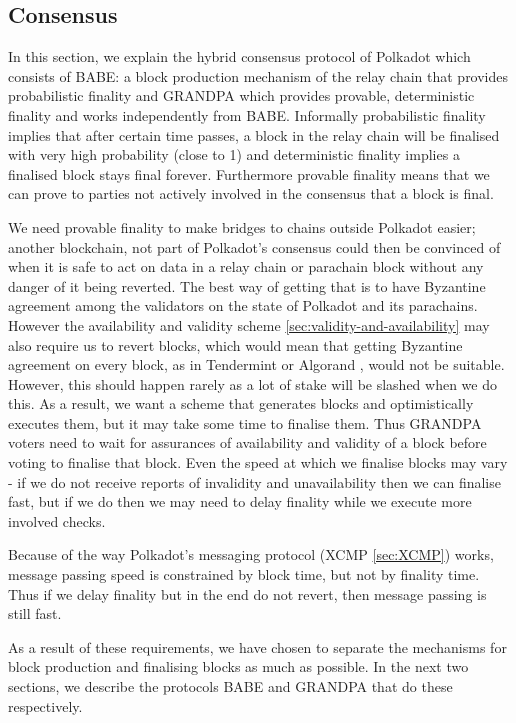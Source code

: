 \subsection{Consensus}\label{sec:consensus}

In this section, we explain the hybrid consensus protocol of Polkadot which consists of BABE: a block production mechanism of the relay chain that provides probabilistic finality and GRANDPA which provides provable, deterministic finality and works independently from BABE.  Informally probabilistic finality implies that after certain time passes, a block in the relay chain will be finalised with very high probability (close to 1) and deterministic finality implies a finalised block stays final forever. Furthermore provable finality means that we can prove to parties not actively involved in the consensus that a block is final.

We need provable finality to make bridges to chains outside Polkadot easier; another blockchain, not part of Polkadot's consensus could then be convinced of when it is safe to act on data in a relay chain or parachain block without any danger of it being reverted. The best way of getting that is to have Byzantine agreement among the validators on the state of Polkadot and its parachains. However the availability and validity scheme \ref{sec:validity-and-availability} may also require us to revert blocks, which would mean that getting Byzantine agreement on every block, as in Tendermint \cite{Tendermint} or Algorand \cite{ALGORAND}, would not be suitable. However, this should happen rarely as a lot of stake will be slashed when we do this. As a result, we want a scheme that generates blocks and optimistically executes them, but it may take some time to finalise them. Thus GRANDPA voters need to wait for assurances of availability and validity of a block before voting to finalise that block.
Even the speed at which we finalise blocks may vary - if we do not receive reports of invalidity and unavailability then we can finalise fast, but if we do then we may need to delay finality while we execute more involved checks. 

Because of the way Polkadot's messaging protocol (XCMP \ref{sec:XCMP}) works, message passing speed is constrained by block time, but not by finality time. Thus if we delay finality but in the end do not revert, then message passing is still fast.

As a result of these requirements, we have chosen to separate the mechanisms for block production and finalising blocks as much as possible. In the next two sections, we describe the protocols BABE and GRANDPA that do these respectively.

